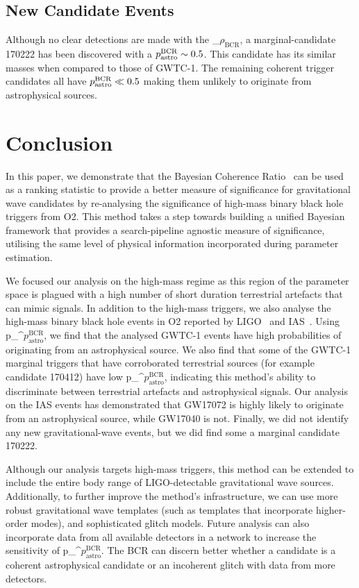 \documentclass[%
 nofootinbib,
 amsmath,amssymb,
 aps,
 twocolumn
]{revtex4-2}
\newcommand{\fancytext}[1]{{\relax\ifmmode#1\else $#1$\fi}\xspace}
\newcommand{\mathcmd}[1]{{\sc \relax\ifmmode#1\else $#1$\fi}\xspace}
\newcommand{\bcr}{\mathcmd{\rho_\text{BCR}}}
\newcommand{\pastrobcr}{\fancytext{p_\text{astro}^{\text{BCR}}}}
\begin{document}
\subsection{New Candidate Events}
Although no clear detections are made with the \bcr, a marginal-candidate 170222 has been discovered with a $\pastrobcr\sim0.5$. This candidate has its similar masses when compared to those of GWTC-1. The remaining coherent trigger candidates all have $\pastrobcr\ll0.5$ making them unlikely to originate from astrophysical sources. 




\section{\label{sec:Conclusion}Conclusion}

In this paper, we demonstrate that the Bayesian Coherence Ratio~\cite{BCR1} can be used as a ranking statistic to provide a better measure of significance for gravitational wave candidates by re-analysing the significance of high-mass binary black hole triggers from O2. This method takes a step towards building a unified Bayesian framework that provides a search-pipeline agnostic measure of significance, utilising the same level of physical information incorporated during parameter estimation. 

We focused our analysis on the high-mass regime as this region of the parameter space is plagued with a high number of short duration terrestrial artefacts that can mimic signals. In addition to the high-mass triggers, we also analyse the high-mass binary black hole events in O2 reported by LIGO~\cite{GWTC1} and IAS~\cite{IAS1, IAS2}. Using \pastrobcr, we find that the analysed GWTC-1 events have high probabilities of originating from an astrophysical source. We also find that some of the GWTC-1 marginal triggers that have corroborated terrestrial sources (for example candidate 170412) have low \pastrobcr, indicating this method's ability to discriminate between terrestrial artefacts and astrophysical signals. Our analysis on the IAS events has demonstrated that GW17072 is highly likely to originate from an astrophysical source, while GW17040 is not. Finally, we did not identify any new gravitational-wave events, but we did find some a marginal candidate 170222. 

Although our analysis targets high-mass triggers, this method can be extended to include the entire body range of LIGO-detectable gravitational wave sources. Additionally, to further improve the method's infrastructure, we can use more robust gravitational wave templates (such as templates that incorporate higher-order modes), and sophisticated glitch models. Future analysis can also incorporate data from all available detectors in a network to increase the sensitivity of \pastrobcr. The BCR can discern better whether a candidate is a coherent astrophysical candidate or an incoherent glitch with data from more detectors. 
\end{document}
